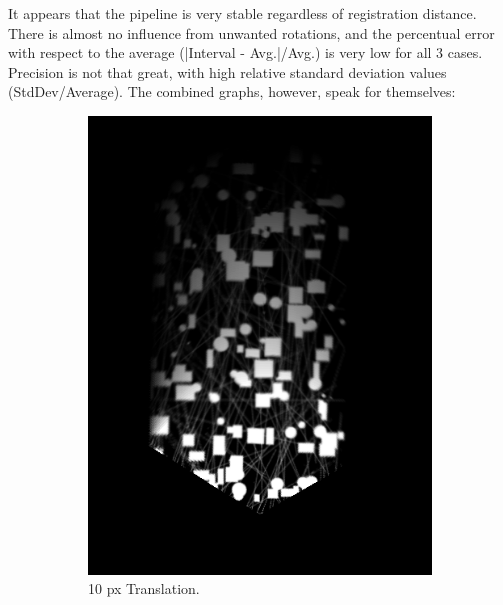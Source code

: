It appears that the pipeline is very stable regardless of registration distance. There is almost no influence from unwanted rotations, and the percentual error with respect to the average (|Interval - Avg.|/Avg.) is very low for all 3 cases. Precision is not that great, with high relative standard deviation values (StdDev/Average). The combined graphs, however, speak for themselves:

\begin{figure}[H]
    \centering
    \begin{subfigure}[b]{0.47\textwidth}
        \centering
        \includegraphics[width=\textwidth]{figures/results/Translation-Surge-Combined/PC-0.png}
        \caption{10 px Translation.}
    \end{subfigure}
    \hfill
    \begin{subfigure}[b]{0.47\textwidth}
        \centering

\end{subfigure}
\end{figure}
